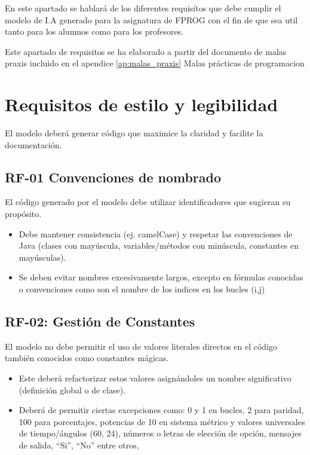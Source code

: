
En este apartado se hablará de los diferentes requisítos que debe cumplir el modelo de I.A  generado para la asignatura de FPROG con el fin de que sea util tanto para los alumnos como para los profesores.

Este apartado de requisitos se ha elaborado a partir del documento de malas praxis incluido en el apendice  \ref{ap:malas_praxis} Malas prácticas de programacion

\section{Requisitos de estilo y legibilidad}
\label{ap:analisis_requisitos}
El modelo deberá generar código que maximice la claridad y facilite la documentación.
\subsection{RF-01 Convenciones de nombrado}
El código generado por el modelo debe utilizar identificadores que sugieran su propósito.

\begin{itemize}
    \item Debe mantener consistencia (ej. camelCase) y respetar las convenciones de Java (clases con mayúscula, variables/métodos con minúscula, constantes en mayúsculas).
    \item Se deben evitar nombres excesivamente largos, excepto en fórmulas conocidas o convenciones como son el nombre de los indices en los bucles (i,j)
\end{itemize}

\subsection{RF-02: Gestión de Constantes}
El modelo no debe permitir el uso de valores literales directos en el código también conocidos como constantes mágicas.

\begin{itemize}
    \item Este deberá refactorizar estos valores asignándoles un nombre significativo (definición global o de clase).
    
    \item Deberá de permitir ciertas excepciones como: 0 y 1 en bucles, 2 para paridad, 100 para porcentajes, potencias de 10 en sistema métrico y valores universales de tiempo/ángulos (60, 24), números o letras de elección de opción, mensajes de salida, “Si”, “No” entre otros,
\end{itemize}

